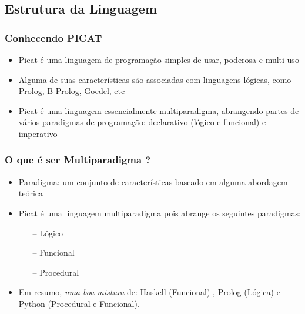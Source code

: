 \subsection{Estrutura da Linguagem}

\begin{frame}
	\frametitle{Conhecendo PICAT}
    
    \begin{itemize}
    
    	\item Picat é uma linguagem de programação simples de usar, poderosa e multi-uso
        
        \item Alguma de suas características 
         são associadas com linguagens lógicas, como Prolog, B-Prolog, Goedel, etc
        
        \pause
        \item Picat é uma linguagem essencialmente multiparadigma,
        abrangendo partes de vários paradigmas de programação: declarativo (lógico e funcional) e     imperativo
        
        
    \end{itemize}
    
\end{frame}


\begin{frame}[fragile]
    \frametitle{O que é ser Multiparadigma ?}

    \begin{itemize}
    
    \item Paradigma: um conjunto de características baseado em alguma abordagem teórica 
    
    \pause
      \item Picat é uma linguagem multiparadigma pois abrange os seguintes paradigmas:
    
      \begin{itemize}
      	\item[--] Lógico
      	\item[--] Funcional
      	\item[--] Procedural
      \end{itemize}
      
     \pause
      \item Em resumo,  \textit{uma boa mistura} de: Haskell (Funcional) , Prolog (Lógica) e 
      Python (Procedural e Funcional).
      
    \end{itemize}
      

\end{frame}

